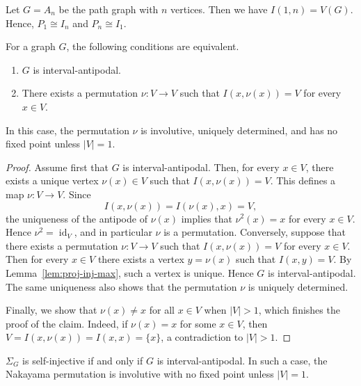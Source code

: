 \documentclass[a4paper,leqno]{amsart}
\begin{document}
\begin{eg}
Let $G=A_n$ be the path graph with $n$ vertices.  Then we have $I(1,n)=V(G)$.  Hence, $P_1\cong I_n$ and $P_n\cong I_1$.
\end{eg}

\begin{lem}\label{lem:interval-antipodal-involution}
For a graph $G$, the following conditions are equivalent.
\begin{enumerate}
\item $G$ is interval-antipodal.
\item There exists a permutation $\nu:V\to V$ such that
$I(x,\nu(x))=V$ for every $x\in V$.
\end{enumerate}
In this case, the permutation $\nu$ is involutive, uniquely determined, and has no fixed point unless $|V|=1$.
\end{lem}

\begin{proof}
Assume first that $G$ is interval-antipodal. Then, for every $x\in V$, there exists a unique vertex $\nu(x)\in V$ such that $I(x,\nu(x))=V$.
This defines a map $\nu:V\to V$. Since
$$I(x,\nu(x))=I(\nu(x),x)=V,$$
the uniqueness of the antipode of $\nu(x)$ implies that $\nu^2(x)=x$ for every $x\in V$. Hence $\nu^2=\operatorname{id}_V$, and in particular $\nu$ is a permutation.
Conversely, suppose that there exists a permutation $\nu:V\to V$ such that $I(x,\nu(x))=V$ for every $x\in V$. Then for every $x\in V$ there exists a vertex $y=\nu(x)$ such that $I(x,y)=V$. By Lemma~\ref{lem:proj-inj-max}, such a vertex is unique. Hence $G$ is interval-antipodal. 
The same uniqueness also shows that the permutation $\nu$ is uniquely determined.

Finally, we show that $\nu(x)\neq x$ for all $x\in V$ when $|V|>1$, which finishes the proof of the claim. Indeed, if $\nu(x)=x$ for some $x\in V$, then $V=I(x,\nu(x))=I(x,x)=\{x\}$, a contradiction to $|V|>1$.
\end{proof}

\begin{thm}\label{thm:self-inj}
$\Sigma_G$ is self-injective if and only if $G$ is interval-antipodal.
In such a case, the Nakayama permutation is involutive with no fixed point unless $|V|=1$.
\end{thm}
\end{document}
